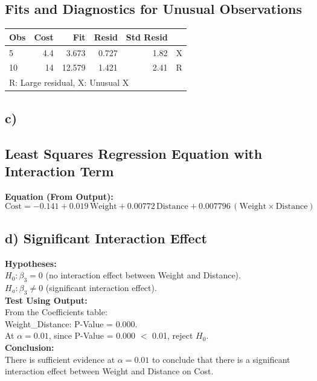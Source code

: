 \documentclass{article}
\begin{document}
\subsection*{Fits and Diagnostics for Unusual Observations}
\begin{tabular}{lrrrrl}
\toprule
Obs & Cost & Fit & Resid & Std Resid & \\
\midrule
5 & 4.4 & 3.673 & 0.727 & 1.82 & X \\
10 & 14 & 12.579 & 1.421 & 2.41 & R \\
\bottomrule
\multicolumn{6}{l}{R: Large residual, X: Unusual X}
\end{tabular}
\newpage




\subsection*{c)}
\subsection*{Least Squares Regression Equation with Interaction Term}
\textbf{Equation (From Output):} \\
\[
\text{Cost} = -0.141 + 0.019 \, \text{Weight} + 0.00772 \, \text{Distance} + 0.007796 \, (\text{Weight} \times \text{Distance})
\]





\subsection*{d)  Significant Interaction Effect}

\textbf{Hypotheses:} \\
\( H_0: \beta_3 = 0 \) (no interaction effect between Weight and Distance). \\
\( H_a: \beta_3 \neq 0 \) (significant interaction effect). \\
\textbf{Test Using Output:} \\
From the Coefficients table: \\
Weight\_Distance: P-Value = 0.000. \\
At \( \alpha = 0.01 \), since P-Value = 0.000 $<$ 0.01, reject \( H_0 \). \\
\textbf{Conclusion:} \\
There is sufficient evidence at \( \alpha = 0.01 \) to conclude that there is a significant interaction effect between Weight and Distance on Cost.
\newpage
\end{document}
